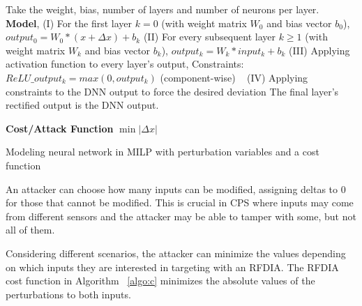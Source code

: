 \begin{algorithm}
	Take the weight, bias, number of layers and number of neurons per layer. \\
	
	\textbf{Model}, \linebreak
	(I) For the first layer $k = 0$ (with weight matrix $W_0$ and bias vector $b_0$), $output_0 = W_0 * (x + \Delta x) + b_k$
	\linebreak
	(II) For every subsequent layer $k \geq 1$ (with weight matrix $W_k$ and bias vector $b_k$), $output_k = W_k * input_k + b_k$
	\linebreak
	(III) Applying activation function to every layer's output,
	\linebreak
	Constraints: $ReLU\_output_k = max(0, output_k)$ (component-wise) \
	\linebreak
	(IV) Applying constraints to the DNN output to force the desired deviation
	\linebreak
	The final layer's rectified output is the DNN output.
	
	\textbf{Cost/Attack Function} \linebreak
	$\min |\Delta x|$
	\caption{Modeling neural network in MILP with perturbation variables and a cost function}
	\label{algo:c}
\end{algorithm}

An attacker can choose how many inputs can be modified, assigning deltas to $0$ for those that cannot be modified. 
This is crucial in \ac{CPS} where inputs may come from different sensors and the attacker may be able to tamper with some, but not all of them.

Considering different scenarios, the attacker can minimize the values depending on which inputs they are interested in targeting with an \ac{RFDIA}. 
The \ac{RFDIA} cost function in Algorithm ~\ref{algo:c} minimizes the absolute values of the perturbations to both inputs.



